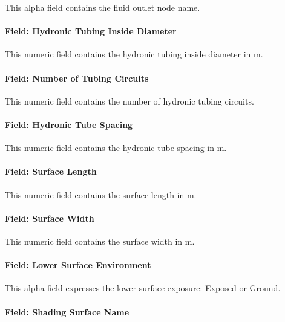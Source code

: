 This alpha field contains the fluid outlet node name.

\paragraph{Field: Hydronic Tubing Inside Diameter}\label{field-hydronic-tubing-inside-diameter-1}

This numeric field contains the hydronic tubing inside diameter in m.

\paragraph{Field: Number of Tubing Circuits}\label{field-number-of-tubing-circuits-1}

This numeric field contains the number of hydronic tubing circuits.

\paragraph{Field: Hydronic Tube Spacing}\label{field-hydronic-tube-spacing}

This numeric field contains the hydronic tube spacing in m.

\paragraph{Field: Surface Length}\label{field-surface-length}

This numeric field contains the surface length in m.

\paragraph{Field: Surface Width}\label{field-surface-width}

This numeric field contains the surface width in m.

\paragraph{Field: Lower Surface Environment}\label{field-lower-surface-environment}

This alpha field expresses the lower surface exposure: Exposed or Ground.

\paragraph{Field: Shading Surface Name}

